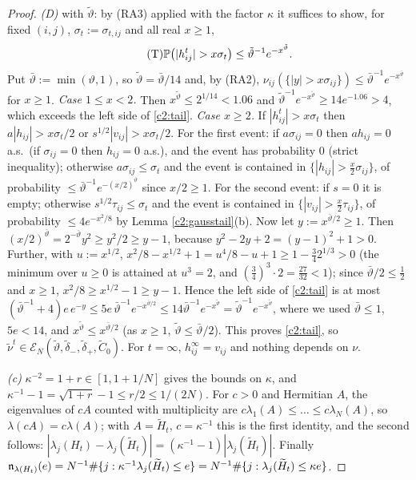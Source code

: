 \begin{proof}
\emph{(D)} with $\tilde\vartheta$: by (RA3) applied with the factor $\kappa$ it suffices to show, for fixed $(i,j)$, $\sigma_t:=\sigma_{t,ij}$ and all real $x\ge1$,
\begin{equation}\tag{T}\label{c2:tail}
\P\big(|h^t_{ij}|>x\sigma_t\big)\le\tilde\vartheta^{-1}e^{-x^{\tilde\vartheta}}.
\end{equation}
Put $\bar\vartheta:=\min(\vartheta,1)$, so $\tilde\vartheta=\bar\vartheta/14$ and, by (RA2), $\nu_{ij}(\{|y|>x\sigma_{ij}\})\le\bar\vartheta^{-1}e^{-x^{\bar\vartheta}}$ for $x\ge1$.
\emph{Case $1\le x<2$.} Then $x^{\tilde\vartheta}\le2^{1/14}<1.06$ and $\tilde\vartheta^{-1}e^{-x^{\tilde\vartheta}}\ge14e^{-1.06}>4$, which exceeds the left side of \eqref{c2:tail}.
\emph{Case $x\ge2$.} If $|h^t_{ij}|>x\sigma_t$ then $a|h_{ij}|>x\sigma_t/2$ or $s^{1/2}|v_{ij}|>x\sigma_t/2$.
For the first event: if $a\sigma_{ij}=0$ then $ah_{ij}=0$ a.s.\ (if $\sigma_{ij}=0$ then $h_{ij}=0$ a.s.), and the event has probability $0$ (strict inequality); otherwise $a\sigma_{ij}\le\sigma_t$ and the event is contained in $\{|h_{ij}|>\frac x2\sigma_{ij}\}$, of probability $\le\bar\vartheta^{-1}e^{-(x/2)^{\bar\vartheta}}$ since $x/2\ge1$.
For the second event: if $s=0$ it is empty; otherwise $s^{1/2}\tau_{ij}\le\sigma_t$ and the event is contained in $\{|v_{ij}|>\frac x2\tau_{ij}\}$, of probability $\le4e^{-x^2/8}$ by Lemma \ref{c2:gausstail}(b).
Now let $y:=x^{\bar\vartheta/2}\ge1$. Then $(x/2)^{\bar\vartheta}=2^{-\bar\vartheta}y^2\ge y^2/2\ge y-1$, because $y^2-2y+2=(y-1)^2+1>0$.
Further, with $u:=x^{1/2}$, $x^2/8-x^{1/2}+1=u^4/8-u+1\ge1-\frac34 2^{1/3}>0$ (the minimum over $u\ge0$ is attained at $u^3=2$, and $(\frac34)^3\cdot2=\frac{27}{32}<1$); since $\bar\vartheta/2\le\frac12$ and $x\ge1$, $x^2/8\ge x^{1/2}-1\ge y-1$.
Hence the left side of \eqref{c2:tail} is at most $(\bar\vartheta^{-1}+4)e\,e^{-y}\le5e\,\bar\vartheta^{-1}e^{-x^{\bar\vartheta/2}}\le14\bar\vartheta^{-1}e^{-x^{\tilde\vartheta}}=\tilde\vartheta^{-1}e^{-x^{\tilde\vartheta}}$, where we used $\bar\vartheta\le1$, $5e<14$, and $x^{\tilde\vartheta}\le x^{\bar\vartheta/2}$ (as $x\ge1$, $\tilde\vartheta\le\bar\vartheta/2$).
This proves \eqref{c2:tail}, so $\tilde\nu^t\in\mathcal E_N(\tilde\vartheta,\tilde\delta_-,\tilde\delta_+,\tilde C_0)$. For $t=\infty$, $h^\infty_{ij}=v_{ij}$ and nothing depends on $\nu$.

\emph{(c)} $\kappa^{-2}=1+r\in[1,1+1/N]$ gives the bounds on $\kappa$, and $\kappa^{-1}-1=\sqrt{1+r}-1\le r/2\le1/(2N)$.
For $c>0$ and Hermitian $A$, the eigenvalues of $cA$ counted with multiplicity are $c\lambda_1(A)\le\dots\le c\lambda_N(A)$, so $\lambda(cA)=c\lambda(A)$; with $A=\widetilde H_t$, $c=\kappa^{-1}$ this is the first identity, and the second follows: $|\lambda_j(H_t)-\lambda_j(\widetilde H_t)|=(\kappa^{-1}-1)|\lambda_j(\widetilde H_t)|$.
Finally $\mathfrak{n}_{\lambda(H_t)}(e)=N^{-1}\#\{j:\kappa^{-1}\lambda_j(\widetilde H_t)\le e\}=N^{-1}\#\{j:\lambda_j(\widetilde H_t)\le\kappa e\}$.
\end{proof}


